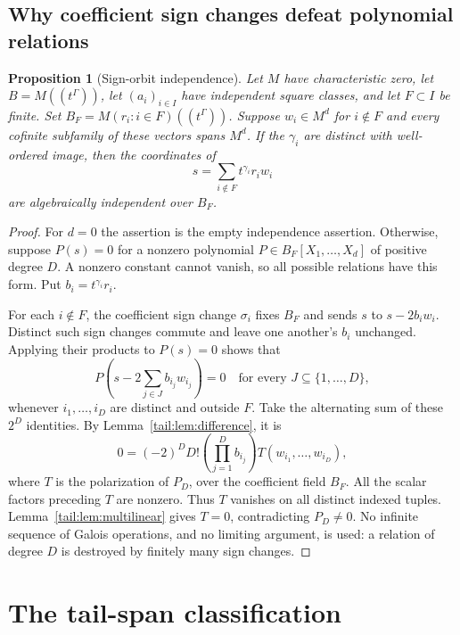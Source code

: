 \documentclass[11pt,a4paper]{article}
\numberwithin{equation}{section}
\newtheorem{proposition}[theorem]{Proposition}
\theoremstyle{definition}
\theoremstyle{remark}
\begin{document}
\subsection{Why coefficient sign changes defeat polynomial relations}
\begin{proposition}[Sign-orbit independence]\label{tail:prop:orbit}
Let $M$ have characteristic zero, let $B=M((t^\Gamma))$, let
$(a_i)_{i\in I}$ have independent square classes, and let $F\subset I$
be finite. Set
$B_F=M(r_i:i\in F)((t^\Gamma))$. Suppose $w_i\in M^d$ for $i\notin F$
and every cofinite subfamily of these vectors spans $M^d$. If the
$\gamma_i$ are distinct with well-ordered image, then the coordinates of
\[
 s=\sum_{i\notin F}t^{\gamma_i}r_iw_i
\]
are algebraically independent over $B_F$.
\end{proposition}
\begin{proof}
For $d=0$ the assertion is the empty independence assertion. Otherwise,
suppose $P(s)=0$ for a nonzero polynomial $P\in B_F[X_1,\ldots,X_d]$ of
positive degree $D$. A nonzero constant cannot vanish, so all possible
relations have this form. Put $b_i=t^{\gamma_i}r_i$.

For each $i\notin F$, the coefficient sign change $\sigma_i$ fixes $B_F$
and sends $s$ to $s-2b_iw_i$. Distinct such sign changes commute and
leave one another's $b_i$ unchanged. Applying their products to $P(s)=0$
shows that
\[
 P\left(s-2\sum_{j\in J}b_{i_j}w_{i_j}\right)=0
 \quad\text{for every }J\subseteq\{1,\ldots,D\},
\]
whenever $i_1,\ldots,i_D$ are distinct and outside $F$.
Take the alternating sum of these $2^D$ identities. By
Lemma~\ref{tail:lem:difference}, it is
\begin{equation}\label{tail:eq:polarzero}
 0=(-2)^D D!\left(\prod_{j=1}^D b_{i_j}\right)
                  T(w_{i_1},\ldots,w_{i_D}),
\end{equation}
where $T$ is the polarization of $P_D$, over the coefficient field $B_F$.
All the scalar factors preceding $T$ are nonzero. Thus $T$ vanishes on
all distinct indexed tuples. Lemma~\ref{tail:lem:multilinear} gives $T=0$,
contradicting $P_D\ne0$. No infinite sequence of Galois operations, and
no limiting argument, is used: a relation of degree $D$ is destroyed by
finitely many sign changes.
\end{proof}

\section{The tail-span classification}\label{tail:sec:classification}
\end{document}
